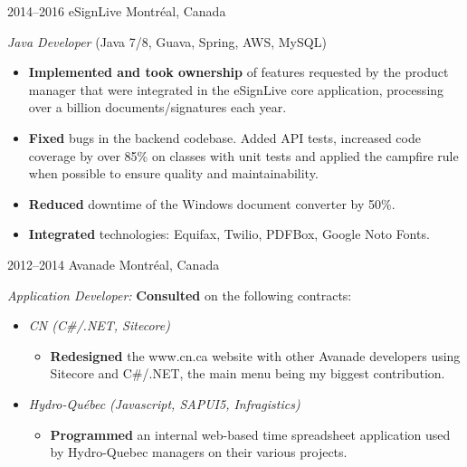 \documentclass[]{friggeri-cv}
\begin{document}
\begin{entrylist}
\entry
{2014--2016}
{eSignLive}
{Montréal, Canada}
{\emph{Java Developer} (Java 7/8, Guava, Spring, AWS, MySQL)
\begin{itemize}
\item \textbf{Implemented and took ownership} of features requested by the product manager that were integrated in the eSignLive core application, processing over a billion documents/signatures each year.
\item \textbf{Fixed} bugs in the backend codebase. Added API tests, increased code coverage by over 85\% on classes with unit tests and applied the campfire rule when possible to ensure quality and maintainability.
\item \textbf{Reduced} downtime of the Windows document converter by 50\%.
\item \textbf{Integrated} technologies: Equifax, Twilio, PDFBox, Google Noto Fonts.
\end{itemize}
}


\entry
{2012--2014}
{Avanade}
{Montréal, Canada}
{\emph{Application Developer:}
\textbf{Consulted} on the following contracts:
\begin{itemize}
\item \emph{CN (C\#/.NET, Sitecore)}
\begin{itemize}
	\item \textbf{Redesigned} the www.cn.ca website with other Avanade developers using Sitecore and C\#/.NET, the main menu being my biggest contribution.
\end{itemize}
\item \emph{Hydro-Québec (Javascript, SAPUI5, Infragistics)}
\begin{itemize}
	\item \textbf{Programmed} an internal web-based time spreadsheet application used by Hydro-Quebec managers on their various projects.
\end{itemize}
\end{itemize}
}
\end{entrylist}

\newpage
\end{document}
